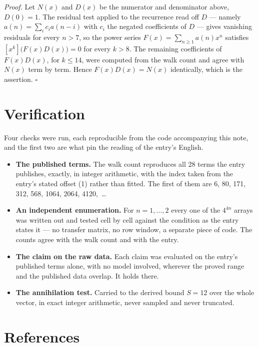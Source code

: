 \documentclass[11pt]{article}
\theoremstyle{definition}
\begin{document}
{\itshape Proof.} Let $N(x)$ and $D(x)$ be the numerator and denominator above, $D(0)=1$. The residual test applied to the recurrence read off $D$ --- namely $a(n) = \sum_i c_i a(n-i)$ with $c_i$ the negated coefficients of $D$ --- gives vanishing residuals for every $n > 7$, so the power series $F(x)=\sum_{n\ge 1}a(n)x^n$ satisfies $[x^k]\bigl(F(x)D(x)\bigr) = 0$ for every $k > 8$. The remaining coefficients of $F(x)D(x)$, for $k \le 14$, were computed from the walk count and agree with $N(x)$ term by term. Hence $F(x)D(x) = N(x)$ identically, which is the assertion. $\square$

\section{Verification}

Four checks were run, each reproducible from the code accompanying this note, and the first two are what pin the reading of the entry's English.

\begin{itemize}

\item {\bfseries The published terms.} The walk count reproduces all 28 terms the entry publishes, exactly, in integer arithmetic, with the index taken from the entry's stated offset (1) rather than fitted. The first of them are 6, 80, 171, 312, 568, 1064, 2064, 4120,~\dots

\item {\bfseries An independent enumeration.} For $n = 1,\dots,2$ every one of the $4^{4n}$ arrays was written out and tested cell by cell against the condition as the entry states it --- no transfer matrix, no row window, a separate piece of code. The counts agree with the walk count and with the entry.

\item {\bfseries The claim on the raw data.} Each claim was evaluated on the entry's published terms alone, with no model involved, wherever the proved range and the published data overlap. It holds there.

\item {\bfseries The annihilation test.} Carried to the derived bound $S = 12$ over the whole vector, in exact integer arithmetic, never sampled and never truncated.

\end{itemize}

\section{References}
\end{document}
